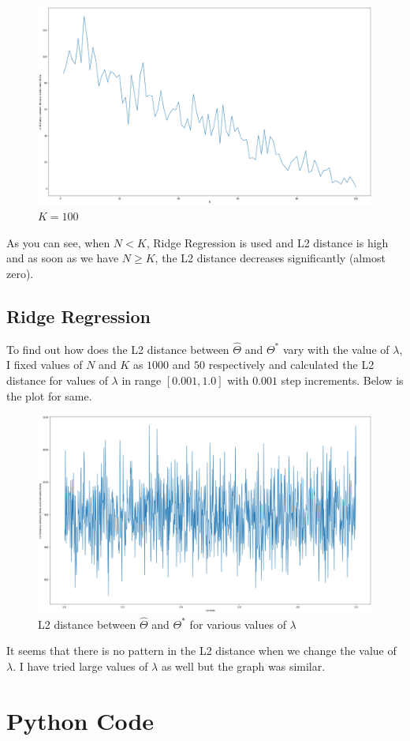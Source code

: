 \documentclass{article}
\begin{document}
\begin{figure}[H]
  \includegraphics[width=\linewidth]{images/k-100.png}
  \caption{$K=100$}
\end{figure}

As you can see, when $N<K$, Ridge Regression is used and L2 distance is high and as soon as we have $N \geq K$, the L2 distance decreases significantly (almost zero).

\subsection{Ridge Regression}
To find out how does the L2 distance between $\hat{\Theta}$ and $\Theta^{*}$ vary with the value of $\lambda$, I fixed values of $N$ and $K$ as $1000$ and $50$ respectively and calculated the L2 distance for values of $\lambda$ in range $[0.001, 1.0]$ with $0.001$ step increments. Below is the plot for same.
\begin{figure}[H]
  \includegraphics[width=\linewidth]{images/lambda.png}
  \caption{L2 distance between $\hat{\Theta}$ and $\Theta^{*}$ for various values of $\lambda$}
\end{figure}

It seems that there is no pattern in the L2 distance when we change the value of $\lambda$. I have tried large values of $\lambda$ as well but the graph was similar. 

\appendix
\section{Python Code}

\end{document}
